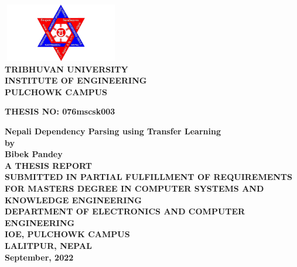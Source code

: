 \begin{titlingpage} %
\begin{normalsize}
\begin{center}
\includegraphics[width=2in, height=1in]{logo}\\ %

\bfseries 
TRIBHUVAN UNIVERSITY\\
 INSTITUTE OF ENGINEERING\\

\textbf{PULCHOWK CAMPUS}\\
\end{center}
\vspace{1cm}
\bfseries THESIS NO: 076mscsk003\\
\begin{center}
\textbf{Nepali Dependency Parsing using Transfer Learning} \\
\vspace{2cm}
\bfseries by\\
    \textbf{Bibek Pandey}\\
\vspace{2cm}
{\textbf{A THESIS REPORT\\SUBMITTED IN PARTIAL FULFILLMENT OF REQUIREMENTS FOR
    MASTERS DEGREE IN COMPUTER SYSTEMS AND KNOWLEDGE
    ENGINEERING}}\\
\vspace{2cm}
\bfseries {DEPARTMENT OF ELECTRONICS AND COMPUTER ENGINEERING}\\
IOE, PULCHOWK CAMPUS \\
LALITPUR, NEPAL\\
\vspace{1.5cm}
September, 2022
\end{center}
\end{normalsize}
\end{titlingpage}
\newpage
